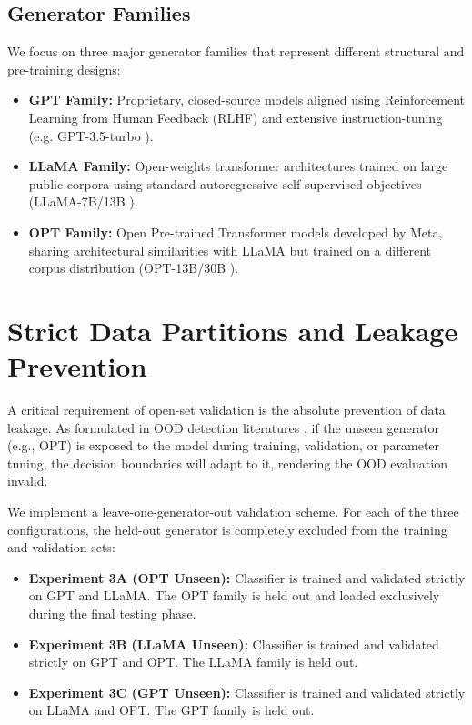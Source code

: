 \subsection{Generator Families}
We focus on three major generator families that represent different structural and pre-training designs:
\begin{itemize}
    \item \textbf{GPT Family:} Proprietary, closed-source models aligned using Reinforcement Learning from Human Feedback (RLHF) and extensive instruction-tuning (e.g. GPT-3.5-turbo \cite{brown2020language}).
    \item \textbf{LLaMA Family:} Open-weights transformer architectures trained on large public corpora using standard autoregressive self-supervised objectives (LLaMA-7B/13B \cite{touvron2023llama}).
    \item \textbf{OPT Family:} Open Pre-trained Transformer models developed by Meta, sharing architectural similarities with LLaMA but trained on a different corpus distribution (OPT-13B/30B \cite{zhang2022opt}).
\end{itemize}

\section{Strict Data Partitions and Leakage Prevention}\label{Chapter-2-Splits}
\noindent A critical requirement of open-set validation is the absolute prevention of data leakage. As formulated in OOD detection literatures \cite{hendrycks2016baseline}, if the unseen generator (e.g., OPT) is exposed to the model during training, validation, or parameter tuning, the decision boundaries will adapt to it, rendering the OOD evaluation invalid. 

We implement a leave-one-generator-out validation scheme. For each of the three configurations, the held-out generator is completely excluded from the training and validation sets:
\begin{itemize}
    \item \textbf{Experiment 3A (OPT Unseen):} Classifier is trained and validated strictly on GPT and LLaMA. The OPT family is held out and loaded exclusively during the final testing phase.
    \item \textbf{Experiment 3B (LLaMA Unseen):} Classifier is trained and validated strictly on GPT and OPT. The LLaMA family is held out.
    \item \textbf{Experiment 3C (GPT Unseen):} Classifier is trained and validated strictly on LLaMA and OPT. The GPT family is held out.
\end{itemize}

